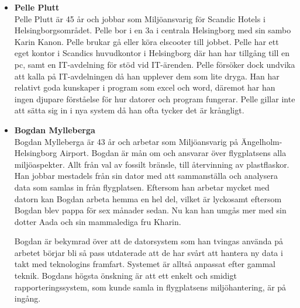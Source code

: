 \documentclass{article}
\begin{document}
\begin{itemize}
\begin{itemize}
            \item [] \textbf{Pelle Plutt}
            \\
            Pelle Plutt är 45 år och jobbar som Miljöansvarig för Scandic Hotels i Helsingborgsområdet. Pelle bor i en 3a i centrala Helsingborg med sin sambo Karin Kanon. Pelle brukar gå eller köra elscooter till jobbet. Pelle har ett eget kontor i Scandics huvudkontor i Helsingborg där han har tillgång till en pc, samt en IT-avdelning för stöd vid IT-ärenden. Pelle försöker dock undvika att kalla på IT-avdelningen då han upplever dem som lite dryga. Han har relativt goda kunskaper i program som excel och word, däremot har han ingen djupare förståelse för hur datorer och program fungerar. Pelle gillar inte att sätta sig in i nya system då han ofta tycker det är krångligt.
            
             \item [] \textbf{Bogdan Mylleberga}
            \\
            Bogdan Mylleberga är 43 år och arbetar som Miljöansvarig på Ängelholm-Helsingborg Airport. Bogdan är mån om och ansvarar över flygplatsens alla miljöaspekter. Allt från val av fossilt bränsle, till återvinning av plastflaskor. Han jobbar mestadels från sin dator med att sammanställa och analysera data som samlas in från flygplatsen. Eftersom han arbetar mycket med datorn kan Bogdan arbeta hemma en hel del, vilket är lyckosamt eftersom Bogdan blev pappa för sex månader sedan. Nu kan han umgås mer med sin dotter Aada och sin mammalediga fru Kharin.

            Bogdan är bekymrad över att de datorsystem som han tvingas använda på arbetet börjar bli så pass utdaterade att de har svårt att hantera ny data i takt med teknologins framfart. Systemet är alltså anpassat efter gammal teknik. Bogdans högsta önskning är att ett enkelt och smidigt rapporteringssystem, som kunde samla in flygplatsens miljöhantering, är på ingång.

        \end{itemize}
        \end{itemize}
        
        \newpage
\end{document}
